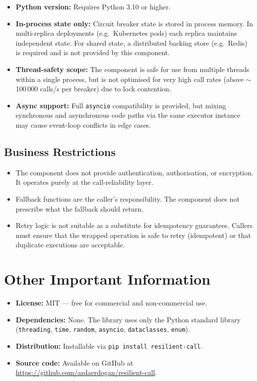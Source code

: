\begin{itemize}[leftmargin=*, label=\textbullet]
    \item \textbf{Python version:} Requires Python 3.10 or higher.
    \item \textbf{In-process state only:} Circuit breaker state is stored in
          process memory. In multi-replica deployments (e.g.\ Kubernetes pods)
          each replica maintains independent state.  For shared state, a
          distributed backing store (e.g.\ Redis) is required and is not
          provided by this component.
    \item \textbf{Thread-safety scope:} The component is safe for use from
          multiple threads within a single process, but is not optimised for
          very high call rates (above $\sim$100\,000 calls/s per breaker) due
          to lock contention.
    \item \textbf{Async support:} Full \texttt{asyncio} compatibility is
          provided, but mixing synchronous and asynchronous code paths via the
          same executor instance may cause event-loop conflicts in edge cases.
\end{itemize}

\subsection{Business Restrictions}

\begin{itemize}[leftmargin=*, label=\textbullet]
    \item The component does not provide authentication, authorisation, or
          encryption.  It operates purely at the call-reliability layer.
    \item Fallback functions are the caller's responsibility.  The component
          does not prescribe what the fallback should return.
    \item Retry logic is not suitable as a substitute for idempotency
          guarantees.  Callers must ensure that the wrapped operation is safe
          to retry (idempotent) or that duplicate executions are acceptable.
\end{itemize}

\section{Other Important Information}
\label{sec:other-info}

\begin{itemize}[leftmargin=*, label=\textbullet]
    \item \textbf{License:} MIT — free for commercial and non-commercial use.
    \item \textbf{Dependencies:} None.  The library uses only the Python
          standard library (\texttt{threading}, \texttt{time}, \texttt{random},
          \texttt{asyncio}, \texttt{dataclasses}, \texttt{enum}).
    \item \textbf{Distribution:} Installable via \texttt{pip install
          resilient-call}.
    \item \textbf{Source code:} Available on GitHub at
          \url{https://github.com/ardaerdogan/resilient-call}.
\end{itemize}
